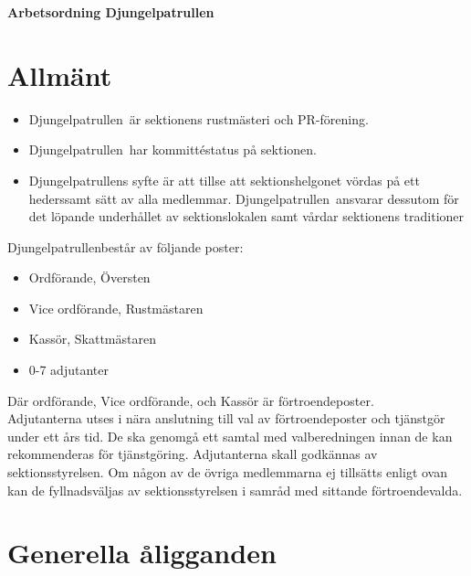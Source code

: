 

\renewcommand{\dateseparator}{-} %

\renewcommand{\forening}{Djungelpatrullen}

\begin{center}
\LARGE{\textbf{Arbetsordning \forening}}
\end{center}


\section{Allmänt}
\begin{itemize}
\item \forening \ är sektionens rustmästeri och PR-förening.
\item \forening \ har kommittéstatus på sektionen.
\item \forening s syfte är att tillse att sektionshelgonet vördas på ett hederssamt sätt av alla medlemmar. \forening \ ansvarar dessutom för det löpande underhållet av sektionslokalen samt vårdar sektionens traditioner
\end{itemize}

\forening  består av följande poster:
\begin{itemize}
\item Ordförande, Översten
\item Vice ordförande, Rustmästaren
\item Kassör, Skattmästaren
\item 0-7 adjutanter
\end{itemize}

Där ordförande, Vice ordförande, och Kassör  är förtroendeposter. \\

Adjutanterna utses i nära anslutning till val av förtroendeposter och tjänstgör under ett års tid. 
De ska genomgå ett samtal med valberedningen innan de kan rekommenderas för tjänstgöring. Adjutanterna skall godkännas av sektionsstyrelsen. 
Om någon av de övriga medlemmarna ej tillsätts enligt ovan kan de fyllnadsväljas av sektionsstyrelsen i samråd med sittande förtroendevalda.

\section{Generella åligganden}

